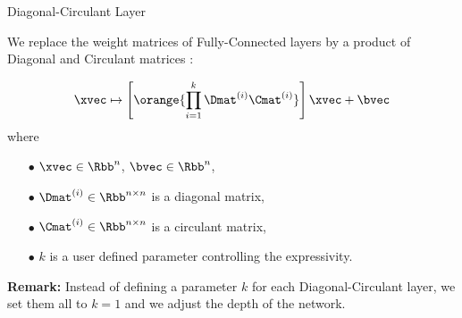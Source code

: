 \begin{frame}{Diagonal-Circulant Layer}

  We replace the weight matrices of Fully-Connected layers by a product of Diagonal and Circulant matrices :

  \begin{equation}
    \xvec \mapsto \left[ \orange{ \prod_{i=1}^{k} \Dmat^{(i)} \Cmat^{(i)} } \right] \xvec + \bvec
  \end{equation}
  where
  \begin{itemize}
    \item[$\bullet$] $\xvec \in \Rbb^n$, $\bvec \in \Rbb^n$,
    \item[$\bullet$] $\Dmat^{(i)} \in \Rbb^{n \times n}$ is a diagonal matrix,
    \item[$\bullet$] $\Cmat^{(i)} \in \Rbb^{n \times n}$ is a circulant matrix,
    \item[$\bullet$] $k$ is a user defined parameter controlling the expressivity.
  \end{itemize}

  \pause
  \textbf{Remark:} Instead of defining a parameter $k$ for each Diagonal-Circulant layer, we set them all to $k = 1$ and we adjust the depth of the network.

\end{frame}



